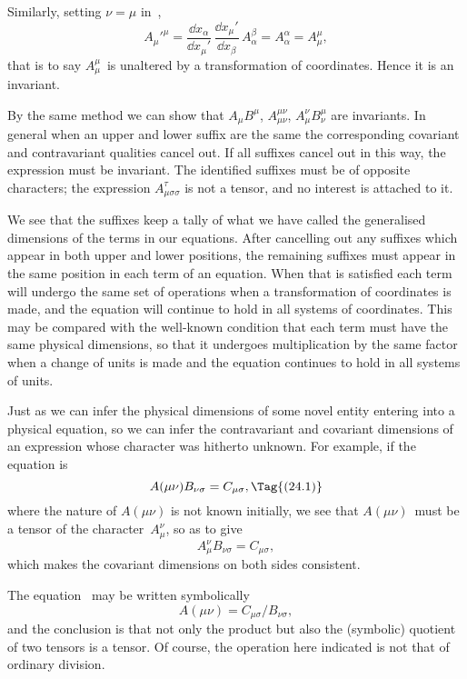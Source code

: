 \documentclass[12pt]{book}
\begin{document}
Similarly, setting $\nu = \mu$ in~,
\[
A_{\mu}'^{\mu}
= \frac{\dd x_{\alpha}}{\dd x_{\mu}'}\,
  \frac{\dd x_{\mu}'}{\dd x_{\beta}}\, A_{\alpha}^{\beta}
= A_{\alpha}^{\alpha} = A_{\mu}^{\mu},
\]
that is to say $A_{\mu}^{\mu}$~is unaltered by a transformation of coordinates. Hence it
is an invariant.

By the same method we can show that $A_{\mu}B^{\mu}$, $A_{\mu\nu}^{\mu\nu}$, $A_{\mu}^{\nu}B_{\nu}^{\mu}$ are invariants.
In general when an upper and lower suffix are the same the corresponding
covariant and contravariant qualities cancel out. If all suffixes cancel out in
this way, the expression must be invariant. The identified suffixes must be
of opposite characters; the expression $A_{\mu\sigma\sigma}^{\tau}$ is not a tensor, and no interest
is attached to it.

We see that the suffixes keep a tally of what we have called the generalised
dimensions of the terms in our equations. After cancelling out any suffixes
which appear in both upper and lower positions, the remaining suffixes must
appear in the same position in each term of an equation. When that is
satisfied each term will undergo the same set of operations when a transformation
of coordinates is made, and the equation will continue to hold in all
systems of coordinates. This may be compared with the well-known condition
that each term must have the same physical dimensions, so that it undergoes
multiplication by the same factor when a change of units is made and the
equation continues to hold in all systems of units.

Just as we can infer the physical dimensions of some novel entity entering
%
%
into a physical equation, so we can infer the contravariant and covariant
dimensions of an expression whose character was hitherto unknown. For
example, if the equation is
\[
A(\mu\nu) B_{\nu\sigma} = C_{\mu\sigma},
\Tag{(24.1)}
\]
where the nature of $A(\mu\nu)$ is not known initially, we see that $A(\mu\nu)$~must
be a tensor of the character~$A_{\mu}^{\nu}$, so as to give
\[
A_{\mu}^{\nu} B_{\nu\sigma} = C_{\mu\sigma},
\]
which makes the covariant dimensions on both sides consistent.

The equation~ may be written symbolically
\[
A(\mu\nu) = C_{\mu\sigma}/B_{\nu\sigma},
\]
and the conclusion is that not only the product but also the (symbolic)
quotient of two tensors is a tensor. Of course, the operation here indicated
is not that of ordinary division.
\end{document}

